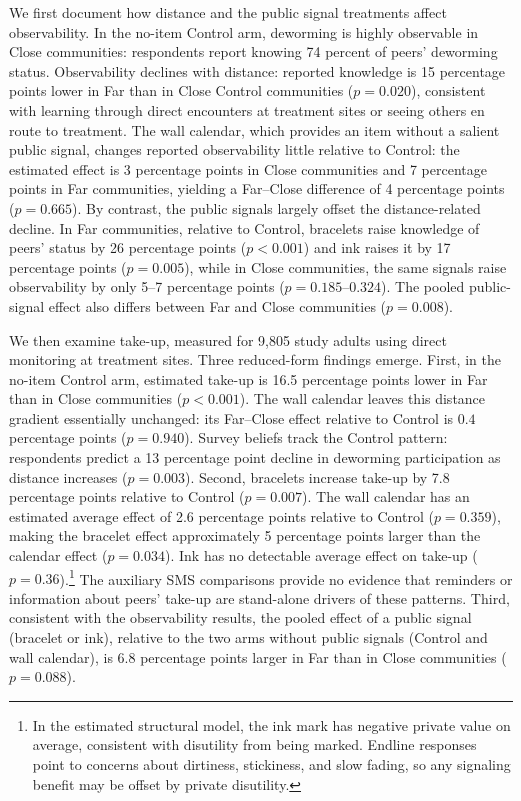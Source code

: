 \documentclass[12pt,a4paper]{article}
\begin{document}
We first document how distance and the public signal treatments affect observability. In the no-item Control arm, deworming is highly observable in Close communities: respondents report knowing 74 percent of peers' deworming status. Observability declines with distance: reported knowledge is 15 percentage points lower in Far than in Close Control communities (\(p=0.020\)), consistent with learning through direct encounters at treatment sites or seeing others en route to treatment. The wall calendar, which provides an item without a salient public signal, changes reported observability little relative to Control: the estimated effect is 3 percentage points in Close communities and 7 percentage points in Far communities, yielding a Far--Close difference of 4 percentage points (\(p=0.665\)). By contrast, the public signals largely offset the distance-related decline. In Far communities, relative to Control, bracelets raise knowledge of peers' status by 26 percentage points (\(p<0.001\)) and ink raises it by 17 percentage points (\(p=0.005\)), while in Close communities, the same signals raise observability by only 5--7 percentage points (\(p=0.185\)--\(0.324\)). The pooled public-signal effect also differs between Far and Close communities (\(p=0.008\)).

We then examine take-up, measured for 9{,}805 study adults using direct monitoring at treatment sites. Three reduced-form findings emerge. First, in the no-item Control arm, estimated take-up is 16.5 percentage points lower in Far than in Close communities (\(p<0.001\)). The wall calendar leaves this distance gradient essentially unchanged: its Far--Close effect relative to Control is \(0.4\) percentage points (\(p=0.940\)). Survey beliefs track the Control pattern: respondents predict a 13 percentage point decline in deworming participation as distance increases (\(p=0.003\)). Second, bracelets increase take-up by 7.8 percentage points relative to Control (\(p=0.007\)). The wall calendar has an estimated average effect of 2.6 percentage points relative to Control (\(p=0.359\)), making the bracelet effect approximately 5 percentage points larger than the calendar effect (\(p=0.034\)). Ink has no detectable average effect on take-up (\(p=0.36\)).\footnote{In the estimated structural model, the ink mark has negative private value on average, consistent with disutility from being marked. Endline responses point to concerns about dirtiness, stickiness, and slow fading, so any signaling benefit may be offset by private disutility.} The auxiliary SMS comparisons provide no evidence that reminders or information about peers' take-up are stand-alone drivers of these patterns. Third, consistent with the observability results, the pooled effect of a public signal (bracelet or ink), relative to the two arms without public signals (Control and wall calendar), is 6.8 percentage points larger in Far than in Close communities (\(p=0.088\)).
\end{document}
